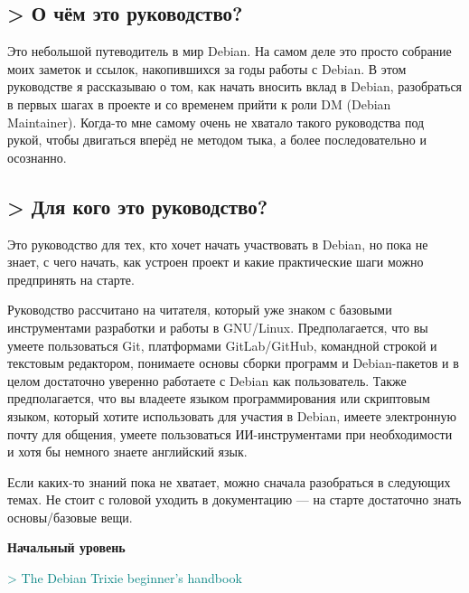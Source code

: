 \subsection*{\textbf{> О чём это руководство?}}
\vspace{-0.5cm}

Это небольшой путеводитель в мир Debian. На самом деле это просто собрание моих
заметок и ссылок, накопившихся за годы работы с Debian. В этом руководстве я
рассказываю о том, как начать вносить вклад в Debian, разобраться в первых шагах
в проекте и со временем прийти к роли DM (Debian Maintainer). Когда-то мне
самому очень не хватало такого руководства под рукой, чтобы двигаться вперёд не
методом тыка, а более последовательно и осознанно.

\vspace{-0.5cm}
\subsection*{\textbf{> Для кого это руководство?}}
\vspace{-0.5cm}

Это руководство для тех, кто хочет начать участвовать в Debian, но пока не
знает, с чего начать, как устроен проект и какие практические шаги можно
предпринять на старте.

Руководство рассчитано на читателя, который уже знаком с базовыми инструментами
разработки и работы в GNU/Linux. Предполагается, что вы умеете пользоваться Git,
платформами GitLab/GitHub, командной строкой и текстовым редактором, понимаете
основы сборки программ и Debian-пакетов и в целом достаточно уверенно работаете
с Debian как пользователь. Также предполагается, что вы владеете языком
программирования или скриптовым языком, который хотите использовать для участия
в Debian, имеете электронную почту для общения, умеете пользоваться
ИИ-инструментами при необходимости и хотя бы немного знаете английский язык.

\vspace{10cm}

Если каких-то знаний пока не хватает, можно сначала разобраться в следующих
темах. Не стоит с головой уходить в документацию --- на старте достаточно знать
основы/базовые вещи.

\textbf{Начальный уровень}

\textcolor{teal}{> The Debian Trixie beginner's handbook}

